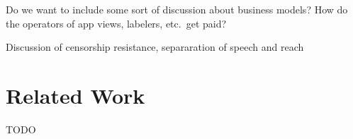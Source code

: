 \documentclass[sigconf,review]{acmart}
\begin{document}
Do we want to include some sort of discussion about business models? How do the operators of app views, labelers, etc.\ get paid?

Discussion of censorship resistance, separaration of speech and reach

\section{Related Work}\label{sec:related-work}








\begin{acks}
TODO
\end{acks}



\end{document}
